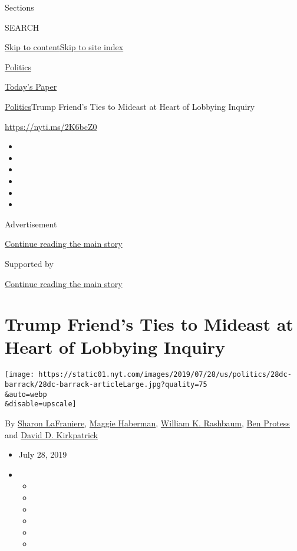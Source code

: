 Sections

SEARCH

\protect\hyperlink{site-content}{Skip to
content}\protect\hyperlink{site-index}{Skip to site index}

\href{https://www.nytimes.com/section/politics}{Politics}

\href{https://myaccount.nytimes.com/auth/login?response_type=cookie\&client_id=vi}{}

\href{https://www.nytimes.com/section/todayspaper}{Today's Paper}

\href{/section/politics}{Politics}\textbar{}Trump Friend's Ties to
Mideast at Heart of Lobbying Inquiry

\url{https://nyti.ms/2K6bcZ0}

\begin{itemize}
\item
\item
\item
\item
\item
\item
\end{itemize}

Advertisement

\protect\hyperlink{after-top}{Continue reading the main story}

Supported by

\protect\hyperlink{after-sponsor}{Continue reading the main story}

\hypertarget{trump-friends-ties-to-mideast-at-heart-of-lobbying-inquiry}{%
\section{Trump Friend's Ties to Mideast at Heart of Lobbying
Inquiry}\label{trump-friends-ties-to-mideast-at-heart-of-lobbying-inquiry}}

\texttt{[image: https://static01.nyt.com/images/2019/07/28/us/politics/28dc-barrack/28dc-barrack-articleLarge.jpg?quality=75\\\&auto=webp\\\&disable=upscale]}

By \href{https://www.nytimes.com/by/sharon-lafraniere}{Sharon
LaFraniere}, \href{https://www.nytimes.com/by/maggie-haberman}{Maggie
Haberman}, \href{https://www.nytimes.com/by/william-k-rashbaum}{William
K. Rashbaum}, \href{https://www.nytimes.com/by/ben-protess}{Ben Protess}
and \href{https://www.nytimes.com/by/david-d-kirkpatrick}{David D.
Kirkpatrick}

\begin{itemize}
\item
  July 28, 2019
\item
  \begin{itemize}
  \item
  \item
  \item
  \item
  \item
  \item
  \end{itemize}
\end{itemize}


